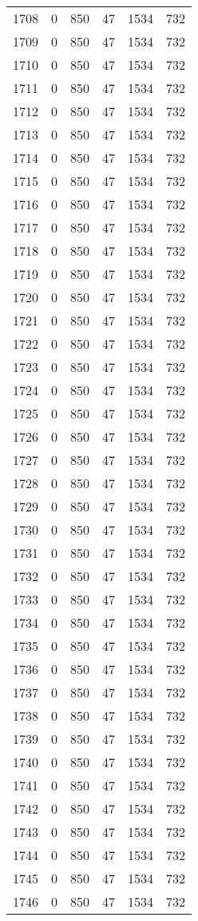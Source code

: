 \documentclass[a4paper]{ctexart}
\begin{document}
\begin{longtable}{p{1cm}|p{2cm}|p{2cm}|p{2cm}|P{2cm}|p{2cm}}
		1708&0&850&47&1534&732\\
		1709&0&850&47&1534&732\\
		1710&0&850&47&1534&732\\
		1711&0&850&47&1534&732\\
		1712&0&850&47&1534&732\\
		1713&0&850&47&1534&732\\
		1714&0&850&47&1534&732\\
		1715&0&850&47&1534&732\\
		1716&0&850&47&1534&732\\
		1717&0&850&47&1534&732\\
		1718&0&850&47&1534&732\\
		1719&0&850&47&1534&732\\
		1720&0&850&47&1534&732\\
		1721&0&850&47&1534&732\\
		1722&0&850&47&1534&732\\
		1723&0&850&47&1534&732\\
		1724&0&850&47&1534&732\\
		1725&0&850&47&1534&732\\
		1726&0&850&47&1534&732\\
		1727&0&850&47&1534&732\\
		1728&0&850&47&1534&732\\
		1729&0&850&47&1534&732\\
		1730&0&850&47&1534&732\\
		1731&0&850&47&1534&732\\
		1732&0&850&47&1534&732\\
		1733&0&850&47&1534&732\\
		1734&0&850&47&1534&732\\
		1735&0&850&47&1534&732\\
		1736&0&850&47&1534&732\\
		1737&0&850&47&1534&732\\
		1738&0&850&47&1534&732\\
		1739&0&850&47&1534&732\\
		1740&0&850&47&1534&732\\
		1741&0&850&47&1534&732\\
		1742&0&850&47&1534&732\\
		1743&0&850&47&1534&732\\
		1744&0&850&47&1534&732\\
		1745&0&850&47&1534&732\\
		1746&0&850&47&1534&732\\

\end{longtable}
\end{document}

